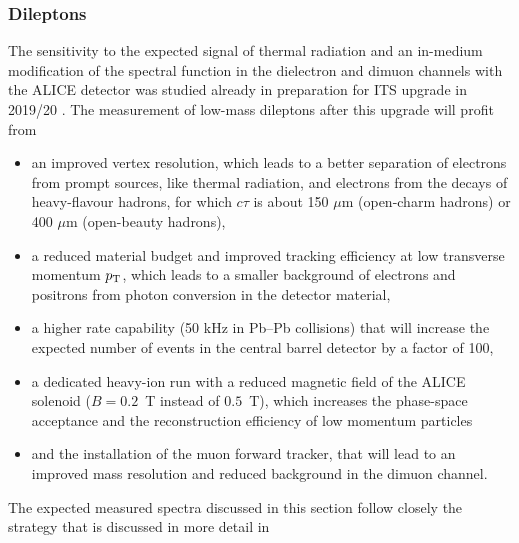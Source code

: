 \documentclass[../report.tex]{subfiles}
\begin{document}
\newpage


\newpage
\subsubsection{Dileptons}
\label{sec:thermalradiation:dileptons}

The sensitivity to the expected signal of thermal radiation and an in-medium modification of the \Prho spectral function in the dielectron and dimuon channels with the ALICE detector \cite{Aamodt:2008zz,Abelev:2014ffa} was studied already in preparation for ITS upgrade in 2019/20 \cite{Abelevetal:2014cna,Abelevetal:2014dna,ALICE:2014qrd,ALICE:MFTLoI}. The measurement of low-mass dileptons after this upgrade will profit from  
\begin{itemize}
\item an improved vertex resolution, which leads to a better separation of electrons from prompt sources, like thermal radiation, and electrons from the decays of heavy-flavour hadrons, for which $c\tau$ is about 150 $\mu$m (open-charm hadrons) or 400 $\mu$m (open-beauty hadrons), 
\item a reduced material budget and improved tracking efficiency at low transverse momentum $p_{\rm T}$, which leads to a smaller background of electrons and positrons from photon conversion in the detector material,
\item a higher rate capability (50 kHz in Pb--Pb collisions) that will increase the expected number of events in the central barrel detector by a factor of 100, 
\item a dedicated heavy-ion run with a reduced magnetic field of the ALICE solenoid ($B=0.2$~T instead of $0.5$~T), which increases the phase-space acceptance and the reconstruction efficiency of low momentum particles 
\item and the installation of the muon forward tracker, that will lead to an improved mass resolution and reduced background in the dimuon channel.
\end{itemize}
The expected measured spectra discussed in this section follow closely the strategy that is discussed in more detail in \cite{Abelevetal:2014cna,Abelevetal:2014dna,ALICE:2014qrd,ALICE:MFTLoI}
\end{document}
